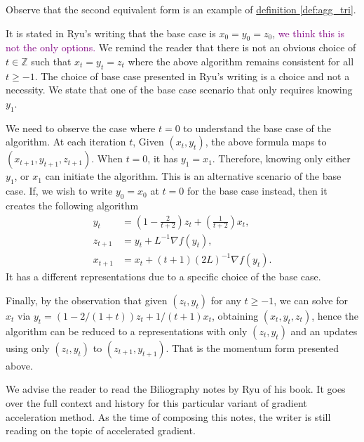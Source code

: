 \documentclass[12pt]{article}
\begin{document}
        \begin{observation}
            Observe that the second equivalent form is an example of \hyperref[def:agg_tri]{definition \ref*{def:agg_tri}}. 
            \par\noindent
            It is stated in Ryu's writing that the base case is $x_0 = y_0 = z_0$, 
            \textcolor{purple}{we think this is not the only options.} 
            We remind the reader that there is not an obvious choice of $t\in \mathbb Z$ such that $x_t = y_t = z_t$ where the above algorithm remains consistent for all $t \ge -1$. 
            The choice of base case presented in Ryu's writing is a choice and not a necessity. 
            We state that one of the base case scenario that only requires knowing $y_1$. 

            \par\noindent 
            We need to observe the case where $t = 0$ to understand the base case of the algorithm. 
            At each iteration $t$, Given $(x_t, y_t)$, the above formula maps to $(x_{t + 1}, y_{t + 1}, z_{t + 1})$. 
            When $t= 0$, it has $y_1 = x_1$. 
            Therefore, knowing only either $y_1$, or $x_1$ can initiate the algorithm. 
            This is an alternative scenario of the base case. 
            If, we wish to write $y_0 = x_0$ at $t = 0$ for the base case instead, then it creates the following algorithm 
            \begin{align*}
                y_{t} &= \left(
                1 - \frac{2}{t + 2} 
                \right)z_{t} + 
                \left(
                    \frac{1}{t + 2}
                \right)x_{t}, 
                \\
                z_{t + 1} &= y_t + L^{-1}\nabla f(y_t), 
                \\
                x_{t + 1} &= x_t + (t + 1)(2L)^{-1}\nabla f(y_t). 
            \end{align*}
            It has a different representations due to a specific choice of the base case. 
            \par\noindent
            Finally, by the observation that given $(z_t, y_t)$ for any $t\ge -1$, we can solve for $x_t$ \newline via $y_t = (1 - 2/(1 + t))z_t + 1/(t + 1)x_t$, obtaining $(x_t, y_t, z_t)$, hence the algorithm can be reduced to a representations with only $(z_t, y_t)$ and an updates using only $(z_t, y_t)$ to $(z_{t + 1}, y_{t + 1})$. 
            That is the momentum form presented above. 
        \end{observation}
        We advise the reader to read the Biliography notes by Ryu \cite[chapter 12]{ryu_large-scale_2022} of his book. 
        It goes over the full context and history for this particular variant of gradient acceleration method. 
        As the time of composing this notes, the writer is still reading on the topic of accelerated gradient. 
\end{document}

